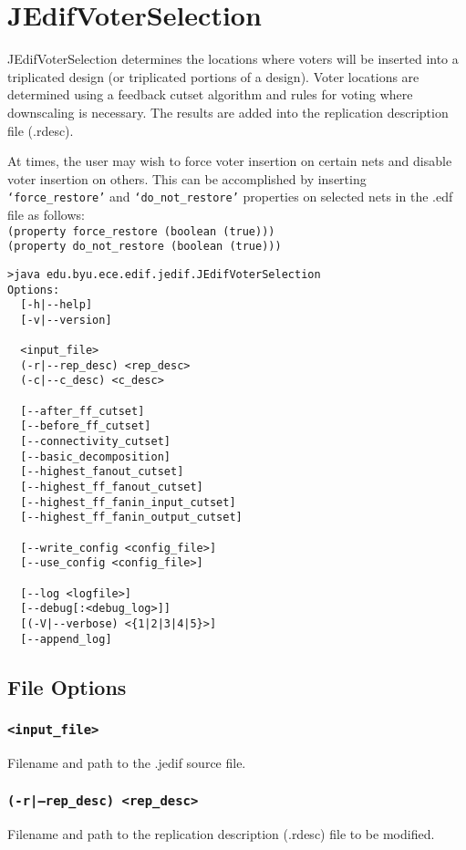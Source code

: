 \section{JEdifVoterSelection}
JEdifVoterSelection determines the locations where voters will be
inserted into a triplicated design (or triplicated portions of a
design). Voter locations are determined using a feedback cutset
algorithm and rules for voting where downscaling is necessary. The
results are added into the replication description file (.rdesc).

At times, the user may wish to force voter insertion on certain nets
and disable voter insertion on others. This can be accomplished by
inserting \texttt{`force\_restore'} and \texttt{`do\_not\_restore'}
properties on selected nets in the .edf file as follows:\\
\texttt{(property force\_restore (boolean (true)))}\\
\texttt{(property do\_not\_restore (boolean (true)))}\\
\begin{verbatim}
>java edu.byu.ece.edif.jedif.JEdifVoterSelection
Options:
  [-h|--help]
  [-v|--version]
  
  <input_file>
  (-r|--rep_desc) <rep_desc>
  (-c|--c_desc) <c_desc>
    
  [--after_ff_cutset]
  [--before_ff_cutset]
  [--connectivity_cutset]
  [--basic_decomposition]
  [--highest_fanout_cutset]
  [--highest_ff_fanout_cutset]
  [--highest_ff_fanin_input_cutset]
  [--highest_ff_fanin_output_cutset]
  
  [--write_config <config_file>]
  [--use_config <config_file>]

  [--log <logfile>]
  [--debug[:<debug_log>]]
  [(-V|--verbose) <{1|2|3|4|5}>]
  [--append_log]
\end{verbatim}
\subsection{File Options}

\subsubsection{\texttt{<input\_file>}}
Filename and path to the .jedif source file.

\subsubsection{\texttt{(-r|--rep\_desc) <rep\_desc>}}
Filename and path to the replication description (.rdesc) file to be modified.

